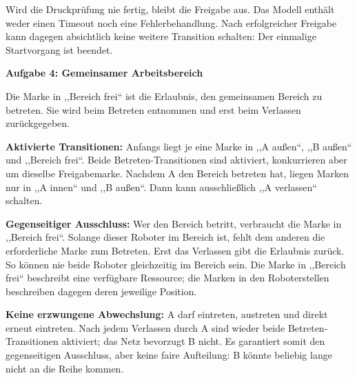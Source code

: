 \begin{loesung}
Wird die Druckprüfung nie fertig, bleibt die Freigabe aus. Das Modell enthält
weder einen Timeout noch eine Fehlerbehandlung. Nach erfolgreicher Freigabe
kann dagegen absichtlich keine weitere Transition schalten: Der einmalige
Startvorgang ist beendet.

\clearpage
\textbf{Aufgabe 4: Gemeinsamer Arbeitsbereich}

Die Marke in ,,Bereich frei`` ist die Erlaubnis, den gemeinsamen Bereich zu betreten.
Sie wird beim Betreten entnommen und erst beim Verlassen zurückgegeben.
\begin{center}
\end{center}

\textbf{Aktivierte Transitionen:} Anfangs liegt je eine Marke in ,,A außen``,
,,B außen`` und ,,Bereich frei``. Beide Betreten-Transitionen sind aktiviert,
konkurrieren aber um dieselbe Freigabemarke. Nachdem A den Bereich betreten hat,
liegen Marken nur in ,,A innen`` und ,,B außen``. Dann kann ausschließlich
,,A verlassen`` schalten.

\textbf{Gegenseitiger Ausschluss:} Wer den Bereich betritt, verbraucht die
Marke in ,,Bereich frei``. Solange dieser Roboter im Bereich ist, fehlt dem
anderen die erforderliche Marke zum Betreten. Erst das Verlassen gibt die
Erlaubnis zurück. So können nie beide Roboter gleichzeitig im Bereich sein.
Die Marke in ,,Bereich frei`` beschreibt eine verfügbare Ressource; die Marken
in den Roboterstellen beschreiben dagegen deren jeweilige Position.

\textbf{Keine erzwungene Abwechslung:} A darf eintreten, austreten und direkt
erneut eintreten. Nach jedem Verlassen durch A sind wieder beide
Betreten-Transitionen aktiviert; das Netz bevorzugt B nicht. Es garantiert
somit den gegenseitigen Ausschluss, aber keine faire Aufteilung:
B könnte beliebig lange nicht an die Reihe kommen.
\end{loesung}

